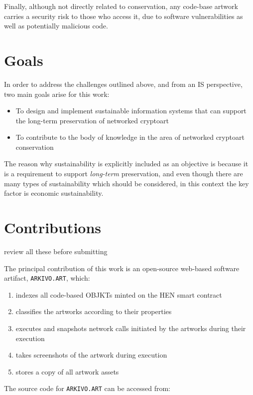 Finally, although not directly related to conservation, any code-base artwork carries a security risk to those who access it, due to software vulnerabilities as well as potentially malicious code.

\section{Goals}

In order to address the challenges outlined above, and from an IS perspective, two main goals arise for this work:

\begin{itemize}
	\item To design and implement sustainable information systems that can support the long-term preservation of networked cryptoart
	\item To contribute to the body of knowledge in the area of networked cryptoart conservation
\end{itemize}

The reason why sustainability is explicitly included as an objective is because it is a requirement to support \emph{long-term} preservation, and even though there are many types of sustainability which should be considered, in this context the key factor is economic sustainability.

\section{Contributions}

\todo  review all these before submitting

The principal contribution of this work is an open-source web-based software artifact, \texttt{ARKIVO.ART}, which:

\begin{enumerate}
	\item indexes all code-based OBJKTs minted on the HEN smart contract
	\item classifies the artworks according to their properties
	\item executes and snapshots network calls initiated by the artworks during their execution
	\item takes screenshots of the artwork during execution
	\item stores a copy of all artwork assets
\end{enumerate}

The source code for \texttt{ARKIVO.ART} can be accessed from:

